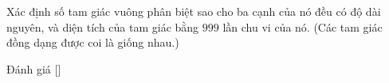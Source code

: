 \ifshowproblem
\begin{problem}\label{problem:CHN-2015-GMO-P5}
    Xác định số tam giác vuông phân biệt sao cho ba cạnh của nó đều có độ dài nguyên, và diện tích của tam giác bằng $999$ lần chu vi của nó.  
(Các tam giác đồng dạng được coi là giống nhau.)
\end{problem}
\fi

\ifshowinfo
Đánh giá [\textbf{}]\footnotemark
{}
\fi